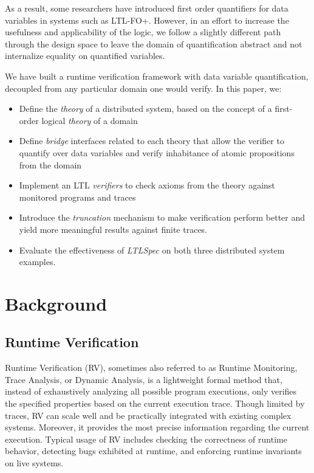 \documentclass[format=acmsmall, nonacm=true, review=true, screen=true]{acmart}
\newcommand{\ltlspec}{\textit{LTLSpec}\xspace}
\begin{document}
As a result, some researchers have introduced first order quantifiers for data variables \cite{khoury_automata-based_2021,margaria_execution_2016,halle_runtime_2012} in systems such as LTL-FO+.
However, in an effort to increase the usefulness and applicability of the logic, we follow a slightly different path through the design space to leave the domain of quantification abstract and not internalize equality on quantified variables.

We have built a runtime verification framework with data variable quantification, decoupled from any particular domain one would verify.
In this paper, we:
\begin{itemize}
  \item Define the \textit{theory} of a distributed system, based on the concept of a first-order logical \textit{theory} of a domain
  \item Define \textit{bridge} interfaces related to each theory that allow the verifier to quantify over data variables and verify inhabitance of atomic propositions from the domain
  \item Implement an LTL \textit{verifiers} to check axioms from the theory against monitored programs and traces
  \item Introduce the \textit{truncation} mechanism to make verification perform better and yield more meaningful results against finite traces.
  \item Evaluate the effectiveness of \ltlspec on both three distributed system examples.
\end{itemize}

\section{Background}
\subsection{Runtime Verification}
Runtime Verification (RV), sometimes also referred to as Runtime Monitoring, Trace Analysis, or Dynamic Analysis, is a lightweight formal method that, instead of exhaustively analyzing all possible program executions, only verifies the specified properties based on the current execution trace. Though limited by traces, RV can scale well and be practically integrated with existing complex systems. Moreover, it provides the most precise information regarding the current execution. Typical usage of RV includes checking the correctness of runtime behavior, detecting bugs exhibited at runtime, and enforcing runtime invariants on live systems.
\end{document}

